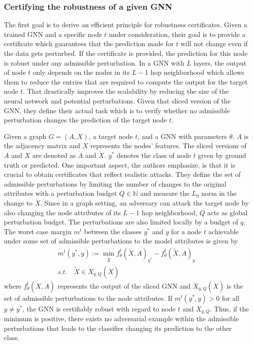 \documentclass[a4paper,preprint]{sig-alternate}
\begin{document}
\subsubsection{Certifying the robustness of a given GNN}

The first goal is to derive an efficient principle for robustness certificates. Given a trained GNN and a specific node $t$ under consideration,
their goal is to provide a certificate which guarantees that the prediction made for $t$ will not change even if the data gets perturbed.
If the certificate is provided, the prediction for this node is robust under any admissible perturbation.\newline
In a GNN with $L$ layers, the output of node $t$ only depends on the nodes in its $L-1$ hop neighborhood
which allows them to reduce the entries that are required to compute the output for the target node $t$. That drastically improves the scalability
by reducing the size of the neural network and potential perturbations. Given that sliced version of the GNN, they define their actual
task which is to verify whether no admissible perturbation changes the prediction of the target node $t$.\newline

Given a graph $G = (A, X)$, a target node $t$, and a GNN with parameters $\theta$. $A$ is the adjacency matrix and $X$ represents the nodes' features.
The sliced versions of $A$ and $X$ are denoted as $\dot{A}$ and $\dot{X}$. $y^*$ denotes the class of node $t$ given by ground truth or predicted.
One important aspect, the authors emphasize, is that it is crucial to obtain certificates that reflect realistic attacks.
They define the set of admissible perturbations by limiting the number of changes to the original attributes with a perturbation
budget $Q \in \mathbb{N}$ and measure the $L_0$ norm in the change to $\dot{X}$. Since in a graph setting, an adversary can attack the target node
by also changing the node attributes of its $L-1$ hop neighborhood, $Q$ acts as global perturbation budget. The perturbations are also limited locally
by a budget of $q$. The worst case margin $m^t$ between the classes $y^*$ and $y$ for a node $t$ achievable under some set
of admissible perturbations to the model attributes is given by
\begin{gather} 
\label{eq:1}
    m^t (y^*, y) := \min_{\tilde{X}} f_{\theta}^t(\tilde{X}, \dot{A})_{y^*} - f_{\theta}^t(\tilde{X}, \dot{A})_y \\
    s.t. \quad \tilde{X} \in X_{q, Q} (\dot{X})
\end{gather}
where $f_{\theta}^t(\dot{X}, \dot{A})$ represents the output of the sliced GNN and $X_{q, Q} (\dot{X})$ is the set
of admissible perturbations to the node attributes.
If $m^t (y^*, y) > 0$ for all $y \neq y^*$, the GNN is certifiably robust with regard to node $t$ and $X_{q, Q}$. 
Thus, if the minimum is positive, there exists no adversarial example within the admissible perturbations that leads 
to the classifier changing its prediction to the other class.\newline
\end{document}
